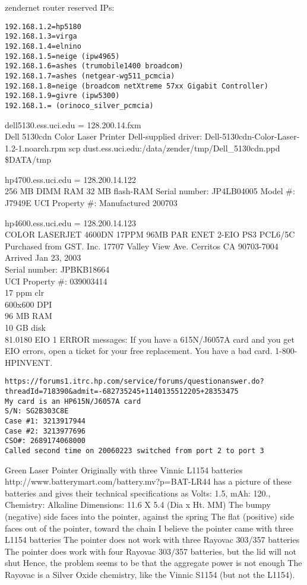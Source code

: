 \documentclass[12pt,twoside]{article}
\begin{document}
zendernet router reserved IPs:
\begin{verbatim}
192.168.1.2=hp5180
192.168.1.3=virga
192.168.1.4=elnino
192.168.1.5=neige (ipw4965)
192.168.1.6=ashes (trumobile1400 broadcom)
192.168.1.7=ashes (netgear-wg511_pcmcia)
192.168.1.8=neige (broadcom netXtreme 57xx Gigabit Controller)
192.168.1.9=givre (ipw5300)
192.168.1.= (orinoco_silver_pcmcia)
\end{verbatim}

dell5130.ess.uci.edu = 128.200.14.fxm \\
Dell 5130cdn Color Laser Printer
Dell-supplied driver:
Dell-5130cdn-Color-Laser-1.2-1.noarch.rpm
scp dust.ess.uci.edu:/data/zender/tmp/Dell\_5130cdn.ppd \${DATA}/tmp

hp4700.ess.uci.edu = 128.200.14.122 \\
256 MB DIMM RAM
32 MB flash-RAM
Serial number: JP4LB04005
Model \#: J7949E
UCI Property \#: 
Manufactured 200703

hp4600.ess.uci.edu = 128.200.14.123 \\
COLOR LASERJET 4600DN 17PPM 96MB PAR ENET 2-EIO PS3 PCL6/5C \\
Purchased from GST. Inc.
17707 Valley View Ave.
Cerritos CA 90703-7004
Arrived Jan 23, 2003 \\
Serial number: JPBKB18664 \\
UCI Property \#: 039003414 \\
17 ppm clr\\ 
600x600 DPI\\
96 MB RAM\\
10 GB disk\\
81.0180 EIO 1 ERROR messages:
If you have a 615N/J6057A card and you get EIO errors, open a ticket
for your free replacement. You have a bad card.
1-800-HPINVENT.
\begin{verbatim}
https://forums1.itrc.hp.com/service/forums/questionanswer.do?threadId=718390&admit=-682735245+1140135512205+28353475
My card is an HP615N/J6057A card 
S/N: SG2B303C8E
Case #1: 3213917944
Case #2: 3213977696
CSO#: 2689174068000
Called second time on 20060223 switched from port 2 to port 3
\end{verbatim}

Green Laser Pointer
Originally with three Vinnic L1154 batteries
http://www.batterymart.com/battery.mv?p=BAT-LR44
has a picture of these batteries and gives their technical specifications as 
Volts: 1.5, mAh: 120., Chemistry: Alkaline
Dimensions: 11.6 X 5.4 (Dia x Ht. MM)
The bumpy (negative) side faces into the pointer, against the spring
The flat (positive) side faces out of the pointer, toward the chain
I believe the pointer came with three L1154 batteries
The pointer does not work with three Rayovac 303/357 batteries
The pointer does work with four Rayovac 303/357 batteries, but the lid will not shut
Hence, the problem seems to be that the aggregate power is not enough
The Rayovac is a Silver Oxide chemistry, like the Vinnic S1154
(but not the L1154).
\end{document}
